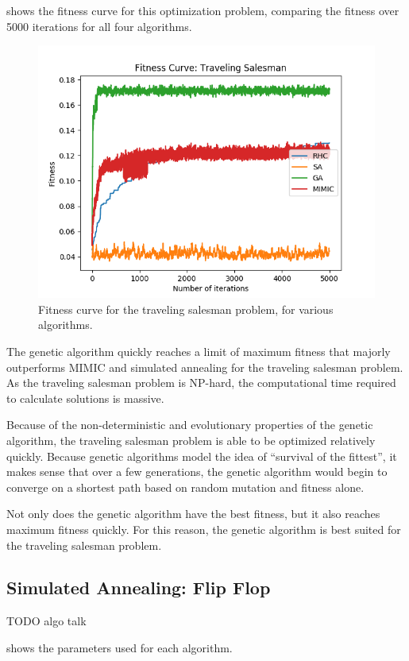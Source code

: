 \documentclass{article}
\begin{document}
       shows the fitness curve for this optimization problem, comparing the fitness over 5000 iterations for all four algorithms.

      \begin{figure}[htb]
      \centering
      \includegraphics[width=.5\linewidth]{out/op/salesman/fitness.png}
      \caption{Fitness curve for the traveling salesman problem, for various algorithms.}
      \label{fig:fitness-ts}
      \end{figure}

      The genetic algorithm quickly reaches a limit of maximum fitness that majorly outperforms MIMIC and simulated annealing for the traveling salesman problem. As the traveling salesman problem is NP-hard, the computational time required to calculate solutions is massive.

      Because of the non-deterministic and evolutionary properties of the genetic algorithm, the traveling salesman problem is able to be optimized relatively quickly. Because genetic algorithms model the idea of ``survival of the fittest'', it makes sense that over a few generations, the genetic algorithm would begin to converge on a shortest path based on random mutation and fitness alone.

      Not only does the genetic algorithm have the best fitness, but it also reaches maximum fitness quickly. For this reason, the genetic algorithm is best suited for the traveling salesman problem.

    \subsection{Simulated Annealing: Flip Flop}
      TODO algo talk

       shows the parameters used for each algorithm.
\end{document}
